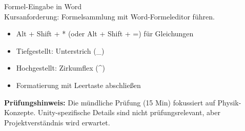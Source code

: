 \begin{example2}{Formel-Eingabe in Word}\\
    Kursanforderung: Formelsammlung mit Word-Formeleditor führen.
    \tcblower
    \begin{itemize}
        \item Alt + Shift + * (oder Alt + Shift + =) für Gleichungen
        \item Tiefgestellt: Unterstrich (\_)
        \item Hochgestellt: Zirkumflex (\^{})
        \item Formatierung mit Leertaste abschließen
    \end{itemize}
\end{example2}

\begin{remark}
    \textbf{Prüfungshinweis:} Die mündliche Prüfung (15 Min) fokussiert auf Physik-Konzepte. Unity-spezifische Details sind nicht prüfungsrelevant, aber Projektverständnis wird erwartet.
\end{remark}